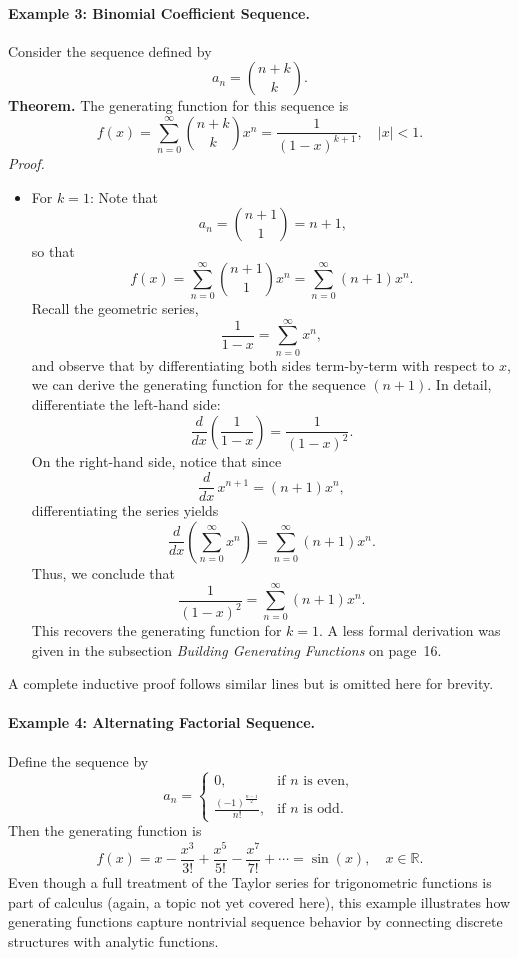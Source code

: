 \documentclass{article}
\begin{document}
\paragraph{Example 3: Binomial Coefficient Sequence.}  
Consider the sequence defined by
\[
a_n=\binom{n+k}{k}.
\]
\textbf{Theorem.} The generating function for this sequence is
\[
f(x)=\sum_{n=0}^{\infty}\binom{n+k}{k}x^n=\frac{1}{(1-x)^{k+1}}, \quad |x|<1.
\]
\newpage
\textit{Proof.}  
\begin{itemize}
    \item For \(k=1\): Note that
    \[
    \ a_n = \binom{n+1}{1} = n+1,
    \]
    so that
    \[
    f(x) = \sum_{n=0}^{\infty} \binom{n+1}{1} x^n = \sum_{n=0}^{\infty} (n+1)x^n.
    \]
    Recall the geometric series,
    \[
    \frac{1}{1-x} = \sum_{n=0}^{\infty} x^n,
    \]
    and observe that by differentiating both sides term-by-term with respect to \(x\), we can derive the generating function for the sequence \((n+1)\). In detail, differentiate the left-hand side:
    \[
    \frac{d}{dx}\left(\frac{1}{1-x}\right) = \frac{1}{(1-x)^2}.
    \]
    On the right-hand side, notice that since
    \[
    \frac{d}{dx}\,x^{n+1} = (n+1)x^n,
    \]
    differentiating the series yields
    \[
    \frac{d}{dx}\left(\sum_{n=0}^{\infty} x^n\right) = \sum_{n=0}^{\infty} (n+1)x^n.
    \]
    Thus, we conclude that
    \[
    \frac{1}{(1-x)^2} = \sum_{n=0}^{\infty} (n+1)x^n.
    \]
    This recovers the generating function for \(k=1\). A less formal derivation was given in the subsection \emph{Building Generating Functions} on page~16.
\end{itemize}
A complete inductive proof follows similar lines but is omitted here for brevity.

\paragraph{Example 4: Alternating Factorial Sequence.}  
Define the sequence by
\[
a_n=
\begin{cases}
0, & \text{if } n \text{ is even},\\[1mm]
\displaystyle \frac{(-1)^{\frac{n-1}{2}}}{n!}, & \text{if } n \text{ is odd}.
\end{cases}
\]
Then the generating function is
\[
f(x)=x-\frac{x^3}{3!}+\frac{x^5}{5!}-\frac{x^7}{7!}+\cdots=\sin(x), \quad x\in\mathbb{R}.
\]
Even though a full treatment of the Taylor series for trigonometric functions is part of calculus (again, a topic not yet covered here), this example illustrates how generating functions capture nontrivial sequence behavior by connecting discrete structures with analytic functions.
\end{document}
